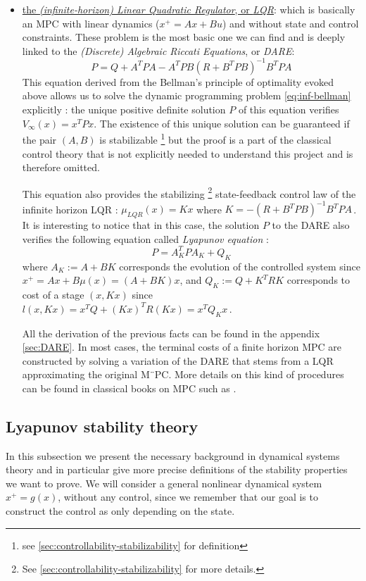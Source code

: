 \documentclass[12pt]{article}
\begin{document}
\begin{itemize}[label=\textbullet]
	\item\underline{the \textit{(infinite-horizon) Linear Quadratic Regulator}, or \textit{LQR}}:\newline
	which is basically an MPC with linear dynamics ($x^+=Ax+Bu$) and without state and control constraints.
	These problem is the most basic one we can find and is deeply linked to the  \textit{(Discrete) Algebraic Riccati Equations}, or \textit{DARE}:
	\begin{equation}
		\label{eq:DARE-LQR}
		P=Q+A^TPA-A^TPB(R+B^TPB)^{-1}B^TPA
	\end{equation}
	This equation derived from the Bellman's principle of optimality evoked above allows us to solve the dynamic programming problem \ref{eq:inf-bellman} explicitly : the unique positive definite solution $P$ of this equation verifies $V_\infty(x)=x^TPx$.
	The existence of this unique solution can be guaranteed if the pair $(A,B)$ is stabilizable \footnote{see \ref{sec:controllability-stabilizability} for definition} but the proof is a part of the classical control theory that is not explicitly needed to understand this project and is therefore omitted.

	This equation also provides the stabilizing \footnote{See \ref{sec:controllability-stabilizability} for more details.} state-feedback control law of the infinite horizon LQR : $\mu_{LQR}(x)=Kx$ where $K=-(R+B^TPB)^{-1}B^TPA$\,.
	It is interesting to notice that in this case, the solution $P$ to the DARE also verifies the following equation called \textit{Lyapunov equation} :
	$$P=A_K^TPA_K+Q_K$$
	where $A_K:=A+BK$ corresponds the evolution of the controlled system since $x^+=Ax+B\mu(x)=(A+BK)x$, and $Q_K:=Q+K^TRK$ corresponds to cost of a stage $(x,Kx)$ since $l(x,Kx)=x^TQ+(Kx)^TR(Kx)=x^TQ_Kx$\,.

	All the derivation of the previous facts can be found in the appendix \ref{sec:DARE}.
	In most cases, the terminal costs of a finite horizon MPC are constructed by solving a variation of the DARE that stems from a LQR approximating the original M¨PC.
	More details on this kind of procedures can be found in classical books on MPC such as \cite{MPC-book}.
\end{itemize}


\subsection{Lyapunov stability theory}\label{sec:Lyapunov-stability-theory}
In this subsection we present the necessary background in dynamical systems theory and in particular give more precise definitions of the stability properties we want to prove.
We will consider a general nonlinear dynamical system $x^+=g(x)$, without any control, since we remember that our goal is to construct the control as only depending on the state.
\end{document}

